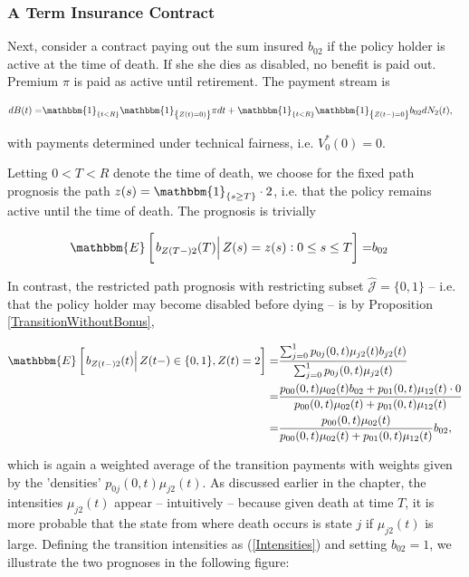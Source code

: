 \documentclass{article}
\newcommand{\1}[1]{\mathbbm{1}_{\left\lbrace #1 \right\rbrace}}
\newcommand{\econd}[2][def]{\mathbbm{E} \left[ \left. #1 \right| #2 \right]}
\theoremstyle{break}
\theoremstyle{remark}
\numberwithin{equation}{section}
\begin{document}
\subsubsection{A Term Insurance Contract}

Next, consider a contract paying out the sum insured $b_{02}$ if the policy holder is active at the time of death. If she she dies as disabled, no benefit is paid out. Premium $\pi$ is paid as active until retirement. The payment stream is

\begin{align*}
	dB(t) =& \1{t<R} \1{Z(t)=0)} \pi dt + \1{t<R} \1{Z(t-)=0} b_{02} d N_2(t),
\end{align*}

with payments determined under technical fairness, i.e. $V_0^*(0)=0$.

Letting $0<T<R$ denote the time of death, we choose for the fixed path prognosis the path $z(s) = \1{s \geq T} \cdot 2$, i.e. that the policy remains active until the time of death. The prognosis is trivially

\begin{align} \label{Fixed2}
	\econd[b_{Z(T-)2}(T)]{ Z(s) = z(s) : 0 \leq s \leq T} =& b_{02}
\end{align}

In contrast, the restricted path prognosis with restricting subset $\hat{\mathcal{J}} = \{ 0,1 \}$ -- i.e. that the policy holder may become disabled before dying -- is by Proposition \ref{TransitionWithoutBonus},

\begin{align} \label{Restricted2}
\begin{split}
	\econd[b_{Z(t-)2}(t)]{Z(t-) \in \{ 0,1 \}, Z(t)=2} =& \frac{\sum_{j=0}^1 p_{0j}(0,t) \mu_{j2}(t) b_{j2}(t)}{\sum_{j=0}^1 p_{0j}(0,t) \mu_{j2}(t)} \\
	=&\frac{p_{00}(0,t) \mu_{02}(t) b_{02} + p_{01}(0,t) \mu_{12}(t) \cdot 0}{p_{00}(0,t) \mu_{02}(t) + p_{01}(0,t) \mu_{12}(t)} \\
	=&\frac{p_{00}(0,t) \mu_{02}(t)}{p_{00}(0,t) \mu_{02}(t) + p_{01}(0,t) \mu_{12}(t)} b_{02},
\end{split}
\end{align}

which is again a weighted average of the transition payments with weights given by the 'densities' $p_{0j}(0,t) \mu_{j2}(t)$. As discussed earlier in the chapter, the intensities $\mu_{j2}(t)$ appear -- intuitively -- because given death at time $T$, it is more probable that the state from where death occurs is state $j$ if $\mu_{j2}(t)$ is large. Defining the transition intensities as (\ref{Intensities}) and setting $b_{02} = 1$, we illustrate the two prognoses in the following figure:
\end{document}
